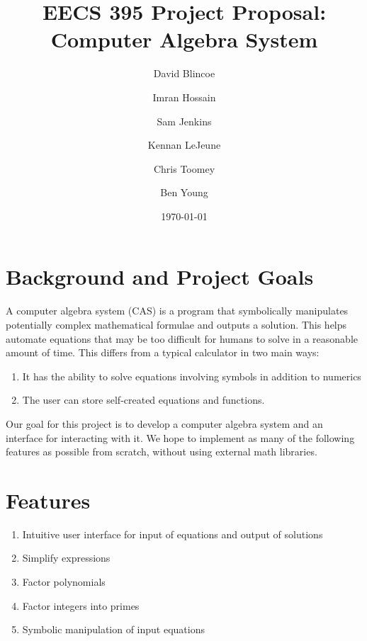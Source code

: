 \documentclass[12pt]{article}
\title{EECS 395 Project Proposal: Computer Algebra System}
\author{David Blincoe \and
Imran Hossain \and
Sam Jenkins \and
Kennan LeJeune \and
Chris Toomey \and Ben Young}
\date{\today}
\begin{document}
    \maketitle
    \section{Background and Project Goals}
      A computer algebra system (CAS) is a program that symbolically manipulates potentially complex mathematical formulae and outputs a solution. This helps automate equations that may be too difficult for humans to solve in a reasonable amount of time. This differs from a typical calculator in two main ways:
      \begin{enumerate}
        \item It has the ability to solve equations involving symbols in addition to numerics
        \item The user can store self-created equations and functions.
      \end{enumerate}
      Our goal for this project is to develop a computer algebra system and an interface for interacting with it. We hope to implement as many of the following features as possible from scratch, without using external math libraries.
    \section{Features}
      \begin{enumerate}
        \item Intuitive user interface for input of equations and output of solutions
        \item Simplify expressions
        \item Factor polynomials
        \item Factor integers into primes
        \item Symbolic manipulation of input equations

      \end{enumerate}
\end{document}
